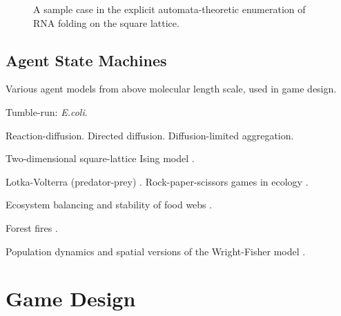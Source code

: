 \documentclass{acm_proc_article-sp}
\begin{document}
\begin{figure}
\caption{
\label{fig:rna}
A sample case in the explicit automata-theoretic enumeration of RNA folding on the square lattice.
}
\end{figure}

\subsection{Agent State Machines}

Various agent models from above molecular length scale, used in game design.

Tumble-run: {\em E.coli}.
\cite{RosserEtAl2013}


Reaction-diffusion.
Directed diffusion.
Diffusion-limited aggregation.
\cite{DLA}

Two-dimensional square-lattice Ising model \cite{Onsager1944}.

Lotka-Volterra (predator-prey) \cite{Lotka1910,Hirota199739}.
Rock-paper-scissors games in ecology \cite{Tainaka2000}.

Ecosystem balancing and stability of food webs \cite{quince2005topological}.

Forest fires \cite{Karafyllidis1997}.

Population dynamics and spatial versions of the Wright-Fisher model \cite{MathiesonMcVean2013}.

\section{Game Design}
\end{document}
